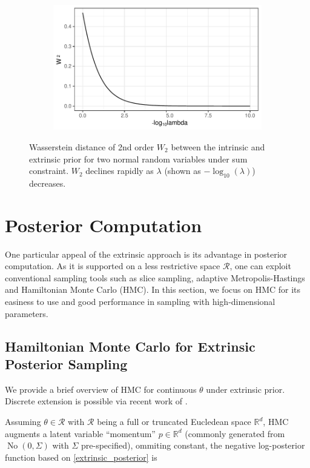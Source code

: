 \documentclass[10pt]{article}
\newcommand{\mc}[1]{\mathcal{#1}}
\DeclareMathOperator{\No}{No}
\DeclareMathOperator{\1}{\mathbbm{1}}
\begin{document}
\begin{figure}[H]
\centering
   \begin{subfigure}[b]{0.45\textwidth}
    \includegraphics[width=1\textwidth]{two_normal_wass.pdf}
	\end{subfigure}
\caption{Wasserstein distance of 2nd order $W_2$ between the intrinsic and extrinsic prior for two normal random variables under sum constraint. $W_2$ declines rapidly as $\lambda$ (shown as $-\log_{10}(\lambda)$) decreases.}
\label{two_normal_wass}
\end{figure}


\section{Posterior Computation}

One particular appeal of the extrinsic approach is its advantage in posterior computation. As it is supported on a less restrictive space $\mc R$, one can exploit conventional sampling tools such as slice sampling, adaptive Metropolis-Hastings and Hamiltonian Monte Carlo (HMC). In this section, we focus on HMC for its easiness to use and good performance in sampling with high-dimensional parameters.

\subsection{Hamiltonian Monte Carlo for Extrinsic Posterior Sampling}

We provide a brief overview of HMC for continuous $\theta$ under extrinsic prior. Discrete extension is possible via recent work of \cite{nishimura2017discontinuous}.

Assuming $\theta\in\mc R$ with $\mc R$ being a full or truncated Eucledean space $\mathbb R^d$, HMC augments a latent variable ``momentum'' $p\in \mathbb R^d$ (commonly generated from $\No(0, \Sigma)$ with $\Sigma$ pre-specified), ommiting constant, the negative log-posterior function based on \eqref{extrinsic_posterior} is
\end{document}
